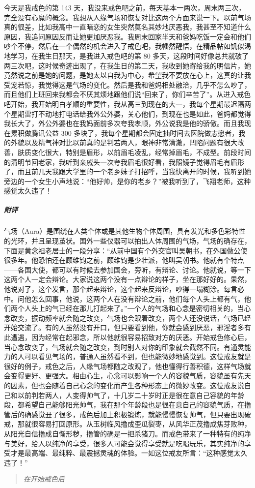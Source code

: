 \begin{case}
    今天是我戒色的第 143 天，我没来戒色吧之前，每天基本一两次，周末两三次，完全没有心魔的概念。我想从人缘气场和恢复对比这两个方面来说一下。以前气场真的很差，比如我高中一直暗恋的女生突然莫名其妙地厌恶我，我甚至不知道什么原因，我追问原因反而让她更加厌恶我。我周末回家半天和爸妈吃饭一定会和他们吵个不停，然后在一个偶然的机会进入了戒色吧，我幡然醒悟，在精品帖如饥似渴地学习，在我生日那天，是我进入戒色吧的第 80 多天，这段时间好像总共就破了两三次吧，这时候奇迹出现了，在我生日的第二天，我收到她寄给我的明信片，她竟然说之前是她的问题，是她太以自我为中心，希望我不要放在心上，这真的让我受宠若惊，我觉得这是气场的变化。然后是我和爸妈相处融洽，几乎不怎么吵了，而且他们上班回来我都会不厌其烦地跟他们说“回来了，你们辛苦了”。从进入戒色吧开始，我开始明白孝顺的重要性，我从高三到现在的大一，我每个星期最迟隔两个星期雷打不动地打电话给我外公外婆，关心他们，到现在也是如此，爸妈都觉得我长大了，外公外婆也在我妈面前多次夸我孝顺，外公说我是他的骄傲。而且我现在累积做腾讯公益 300 多块了，我每个星期都会固定抽时间去医院做志愿者，我的外貌以及精气神对比以前真的是判若两人，眼神非常清澈，凹陷问题有很大改善，肤质变化很大，特别是眉形，以前眉毛凌乱，经常掉眉毛，不成型。前段时间的清明节回老家，我听到亲戚头一次夸我眉毛很好看，我照镜子觉得眉毛有眉形了，而且前几天我跟大学里的一个老乡妹子打招呼，当我快离开的时候，我听到她旁边的一个女生小声地说：“他好帅，是你的老乡？”被我听到了，飞翔老师，这种感觉太久违了！
    \subparagraph{附评} 气场（Aura）是围绕在人类个体或是其他生物个体周围，具有发光和多色彩特性的光环，并且呈现茧状。国外一些仪器可以拍出人体周围的气场，气场的确存在，下面是黄念祖老居士的一段分享：“从前中国有个外交官叫吴朝书，在外国做公使很多年。他恐怕还在顾维钧之前，顾维钧是少壮派，他叫吴朝书。他就有个特点——各国大使，都可以有时候去参加国会，旁听，有辩论、讨论。他就说，等一下这两个人一定会辩论。大家说这两个没有一点辩论的样子，坐在那好好的。果然，他说对了，这个发言，那个起来辩论，这个起来反辩论，吵得一塌糊涂。每言必中。问他怎么回事，他说，这两个人在没有辩论之前，他们每个人头上都有气，他们两个人头上的气已经在那儿打起来了。”一个人的气场和心念是密切相关的，当心念改变，振动频率就会随之改变，气场也会跟着改变，两个人还没说话，气场已经开始交流了。有的人虽然没有开口，但只要看到他，你就会感到厌恶，邪淫者多有此遭遇，因为经常在起邪念，所以他就很容易招致对方的厌恶。开始戒色修心后，当心念改变了，气场就会随之改变，到时别人对你的印象就会截然不同。有通灵能力的人可以看见气场的，普通人虽然看不到，但也能微妙地感觉到。这位戒友就是很好的例子，戒色之后，人缘气场都随之改观了，他也懂得行善积德，这样气场就会变得更好、更强大。相由心生，心念可以影响一个人的容貌气质，容貌虽有先天的因素，但也会随着自己心念的变化而产生各种形态上的微妙改变。这位戒友说自己和以前判若两人，人变得帅气了，十几岁二十岁时正是很在意自己容貌的年龄段，都希望自己能够阳光帅气，我在那个年龄段也是很在意自己的容貌气质，在撸管后的确感觉丑了很多，戒色后加上积极锻炼，就能慢慢恢复帅气，但只要出现破戒，那就很容易打回原形。从玉树临风撸成歪瓜裂枣，从风华正茂撸成焦芽败种，从阳光自信撸成自惭形秽，撸管的确是一把杀猪刀。而戒色带来了一种特有的纯净与美好，给人以纯净的享受，很多人可能会觉得享受就是吃喝玩乐，其实纯净的享受才是最高端、最纯粹、最震撼灵魂的体验。一如这位戒友所言：“这种感觉太久违了！”\begin{quotation}\it
        在开始戒色后


\end{quotation}
\end{case}
